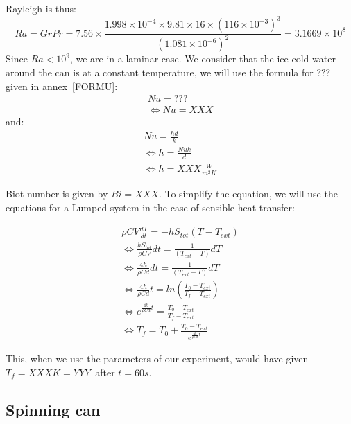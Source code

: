 \documentclass{report}
\begin{document}
	
	Rayleigh is thus: 
	\begin{equation}
		Ra = GrPr= 7.56\times \frac{1.998\times 10^{-4}\times 9.81\times 16\times (116\times 10^{-3})^3}{(1.081\times 10^{-6})^2}= 3.1669\times 10^{8}
	\end{equation}
	Since $Ra<10^9$, we are in a laminar case. We consider that the ice-cold water around the can is at a constant temperature, we will use the formula for ??? given in annex~\ref{FORMU}:
	\begin{equation}
		\begin{gathered}
		Nu=???\\
		\Leftrightarrow Nu=XXX
		\end{gathered}	
	\end{equation}
	and:
	\begin{equation}
		\begin{gathered}
		Nu=\frac{hd}{k}\\
		\Leftrightarrow h=\frac{Nu k}{d}\\
		\Leftrightarrow h=XXX \frac{W}{m^2K}
		\end{gathered}	
	\end{equation}
	
	Biot number is given by $Bi=XXX$. To simplify the equation, we will use the equations for a Lumped system in the case of sensible heat transfer:
	
	\begin{equation}
		\begin{gathered}
		\rho CV\frac{dT}{dt}=-hS_{tot}(T-T_{ext})\\
		\Leftrightarrow \frac{hS_{tot}}{\rho CV}dt=\frac{1}{(T_{ext}-T)}dT\\
		\Leftrightarrow \frac{4h}{\rho Cd}dt=\frac{1}{(T_{ext}-T)}dT\\
		\Leftrightarrow \frac{4h}{\rho Cd}t=ln(\frac{T_0-T_{ext}}{T_f-T_{ext}})\\
		\Leftrightarrow e^{\frac{4h}{\rho Cd}t}=\frac{T_0-T_{ext}}{T_f-T_{ext}}\\
		\Leftrightarrow T_f=T_0+\frac{T_0-T_{ext}}{e^{\frac{4h}{\rho Cd}t}}
		\end{gathered}
	\end{equation}
	
	This, when we use the parameters of our experiment, would have given $T_f=XXXK=YYY$\textcelsius\ after $t=60s$.
	
	\subsection{Spinning can}
	
\end{document}
